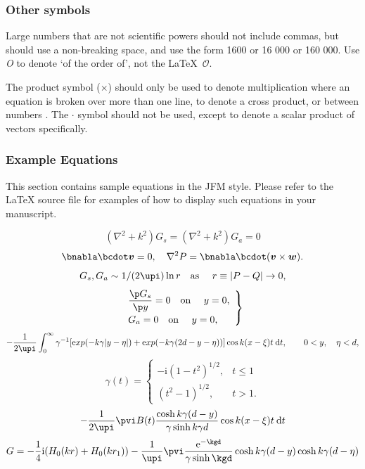 \documentclass[lineno]{JFM-FLM_Au}
\begin{document}
\subsubsection{Other symbols}

Large numbers  that are not scientific powers should not include commas, but should use a non-breaking space, and use the form 1600 or 16 000 or 160 000.
Use \textit{O} to denote `of the order of', not the \LaTeX\ $\mathcal{O}$.

The product symbol ($\times$) should only be used to denote multiplication where an equation is broken over more than one line, to denote a cross product, or between numbers . The $\boldsymbol {\cdot}$ symbol should not be used, except to denote a scalar product of vectors specifically.

\subsubsection{Example Equations}

This section contains sample equations in the JFM style. Please refer to the {\LaTeX} source file for examples of how to display such equations in your manuscript.

\begin{equation}
  (\nabla^2+k^2)G_s=(\nabla^2+k^2)G_a=0
  \label{Helm}
\end{equation}
\begin{equation}
  \bnabla\bcdot\boldsymbol{v} = 0,\quad \nabla^{2}P=
    \bnabla\bcdot(\boldsymbol{v}\times \boldsymbol{w}).
\end{equation}
\begin{equation}
  G_s,G_a\sim 1 / (2\upi)\ln r
  \quad \mbox{as\ }\quad r\equiv|P-Q|\rightarrow 0,
  \label{singular}
\end{equation}
\begin{equation}
\left. \begin{array}{ll}
\displaystyle\frac{\p G_s}{\p y}=0
  \quad \mbox{on\ }\quad y=0,\\[8pt]
\displaystyle  G_a=0
  \quad \mbox{on\ }\quad y=0,
 \end{array}\right\}
  \label{symbc}
\end{equation}
\begin{equation}
  -\frac{1}{2\upi} \int_0^{\infty} \gamma^{-1}[\mathrm exp(-k\gamma|y-\eta|)
   + \mathrm exp(-k\gamma(2d-y-\eta))] \cos k(x-\xi)t\:\mathrm{d} t,
   \qquad 0<y,\quad \eta<d,
\end{equation}
\begin{equation}
  \gamma(t) = \left\{
    \begin{array}{ll}
      -\mathrm{i}(1-t^2)^{1/2}, & t\le 1 \\[2pt]
      (t^2-1)^{1/2},         & t>1.
    \end{array} \right.
\end{equation}
\[
  -\frac{1}{2\upi}
   \pvi B(t)\frac{\cosh k\gamma(d-y)}{\gamma\sinh k\gamma d}
   \cos k(x-\xi)t\:\mathrm{d} t
\]
\begin{equation}
  G = -\frac{1}{4}\mathrm{i} (H_0(kr)+H_0(kr_1))
    - \frac{1}{\upi} \pvi\frac{\mathrm{e}^{-\kgd}}%
    {\gamma\sinh\kgd} \cosh k\gamma(d-y) \cosh k\gamma(d-\eta)
\end{equation}
\end{document}
